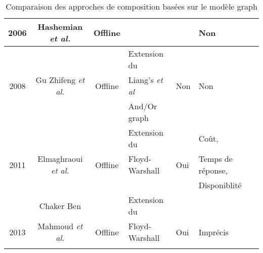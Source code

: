 \begin{table}[htb!]
{\begin{tabular}{|c|c|c|>{\centering\arraybackslash}m{1.5in}|>{\centering\arraybackslash}m{1in}|>{\centering\arraybackslash}m{1.8in}|@{}m{0pt}@{}}
    2006    &  Hashemian \textit{et al.} \cite{hashemian2006graph}        &  Offline   &                &           &       Non                &\\ [5ex]

    \hline %

            &                             &             & Extension du      &         &                          &\\ 
    2008    & Gu Zhifeng \textit{et al.} \cite{gu2008automatic}       &   Offline   & Liang's \textit{et al} \cite{liang2005and} &  Non    &       Non                &\\ 
            &                             &             &  And/Or graph     &         &                          &\\ 

    \hline %

           &                               &            & Extension du   &            &    Coût,                &\\
    2011   &   Elmaghraoui \textit{et al.} \cite{elmaghraoui2011graph}      &  Offline   & Floyd-Warshall & Oui        &    Temps de réponse,    &\\
           &                               &            &                &            &    Disponiblité         &\\
    \hline %

           &    Chaker Ben                 &            & Extension du   &            &                         &\\
    2013   &  Mahmoud \textit{et al.} \cite{mahmoud2013towards}           &  Offline   & Floyd-Warshall & Oui        &    Imprécis             &\\
           &                               &            &                &            &                         &\\
    \hline %
  \end{tabular}}
  \newline
  \caption{Comparaison des approches de composition basées sur le modèle graph}
  \label{comparaison-graph-composition}
\end{table}
